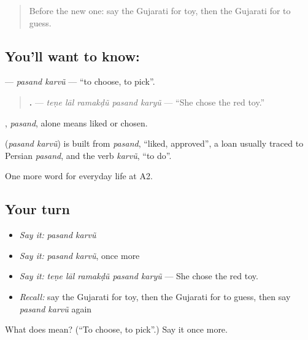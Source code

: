 \label{lesson:GU-C260-pasand-karvu}



\begin{quote}
Before the new one: say the Gujarati for toy, then the Gujarati for to guess.
\end{quote}

\subsection*{You'll want to know:  }
\textbf{ } — \emph{pasand karvũ} — \textquotedblleft{}to choose, to pick\textquotedblright{}.

\begin{quote}
\textbf{    .} — \emph{teṇe lāl ramakḍũ pasand karyũ} — \textquotedblleft{}She chose the red toy.\textquotedblright{}
\end{quote}

\textbf{}, \emph{pasand}, alone means liked or chosen.

\begin{cousinweb}
\textbf{ } (\emph{pasand karvũ}) is built from \emph{pasand}, \textquotedblleft{}liked, approved\textquotedblright{}, a loan usually traced to Persian \emph{pasand}, and the verb \emph{karvũ}, \textquotedblleft{}to do\textquotedblright{}.
\end{cousinweb}

\begin{grammarlens}[title={What you've built}]
One more word for everyday life at A2.
\end{grammarlens}

\subsection*{Your turn}
\begin{itemize}
\raggedright
  \item \emph{Say it:} \emph{pasand karvũ}
  \item \emph{Say it:} \emph{pasand karvũ}, once more
  \item \emph{Say it:} \emph{teṇe lāl ramakḍũ pasand karyũ} — She chose the red toy.
  \item \emph{Recall:} say the Gujarati for toy, then the Gujarati for to guess, then say \emph{pasand karvũ} again
\end{itemize}

\begin{tcolorbox}[breakable,colback=teal!4,colframe=teal!35!black,title={Before you move on}]
What does   mean? (\textquotedblleft{}To choose, to pick\textquotedblright{}.) Say it once more.
\end{tcolorbox}
